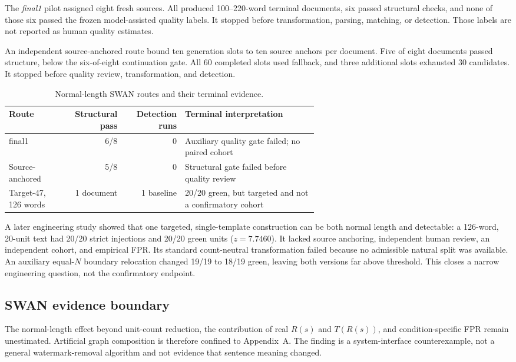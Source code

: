 \documentclass[10pt]{article}
\begin{document}
The \emph{final1} pilot assigned eight fresh sources. All produced
100--220-word terminal documents, six passed structural checks, and none of
those six passed the frozen model-assisted quality labels. It stopped before
transformation, parsing, matching, or detection. Those labels are not
reported as human quality estimates.

An independent source-anchored route bound ten generation slots to ten source
anchors per document. Five of eight documents passed structure, below the
six-of-eight continuation gate. All 60 completed slots used fallback, and
three additional slots exhausted 30 candidates. It stopped before quality
review, transformation, and detection.

\begin{table}[t]
\caption{Normal-length SWAN routes and their terminal evidence.}
\label{tab:swan-stops}
\centering
\small
\begin{tabular}{p{0.18\linewidth}rrp{0.43\linewidth}}
\toprule
Route & Structural pass & Detection runs & Terminal interpretation \\
\midrule
final1 & 6/8 & 0 & Auxiliary quality gate failed; no paired cohort \\
Source-anchored & 5/8 & 0 & Structural gate failed before quality review \\
Target-47, 126 words & 1 document & 1 baseline &
20/20 green, but targeted and not a confirmatory cohort \\
\bottomrule
\end{tabular}
\end{table}

A later engineering study showed that one targeted, single-template
construction can be both normal length and detectable: a 126-word,
20-unit text had 20/20 strict injections and 20/20 green units
($z=7.7460$). It lacked source anchoring, independent human review, an
independent cohort, and empirical FPR. Its standard count-neutral
transformation failed because no admissible natural split was available.
An auxiliary equal-$N$ boundary relocation changed 19/19 to 18/19 green,
leaving both versions far above threshold. This closes a narrow engineering
question, not the confirmatory endpoint.

\subsection{SWAN evidence boundary}

The normal-length effect beyond unit-count reduction, the contribution of
real $R(s)$ and $T(R(s))$, and condition-specific FPR remain unestimated.
Artificial graph composition is therefore confined to Appendix~A. The
finding is a system-interface counterexample, not a general watermark-removal
algorithm and not evidence that sentence meaning changed.
\end{document}

